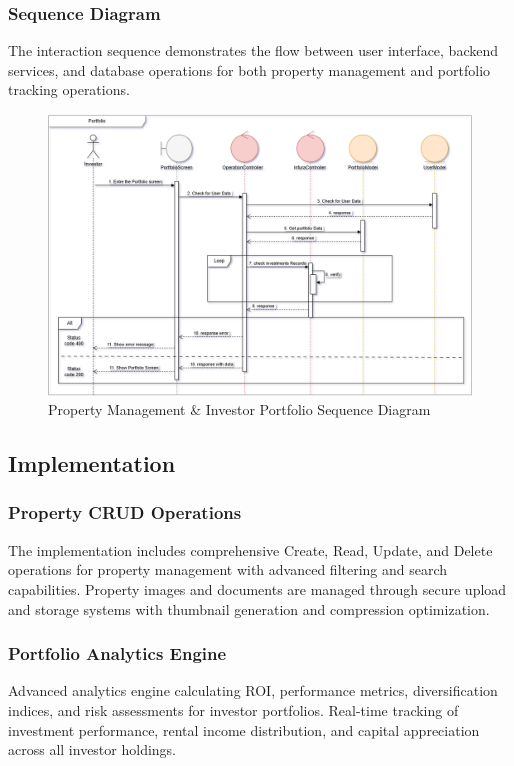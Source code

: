 \subsubsection{Sequence Diagram}
The interaction sequence demonstrates the flow between user interface, backend services, and database operations for both property management and portfolio tracking operations.
\newpage
\begin{figure}[htbp]
    \centering
    \includegraphics[width=1\textwidth]{images/property_portfolio_sequence.png}
    \caption{Property Management \& Investor Portfolio Sequence Diagram}
    \label{fig:property-portfolio-sequence}
\end{figure}

\subsection{Implementation}
\subsubsection{Property CRUD Operations}
The implementation includes comprehensive Create, Read, Update, and Delete operations for property management with advanced filtering and search capabilities. Property images and documents are managed through secure upload and storage systems with thumbnail generation and compression optimization.

\subsubsection{Portfolio Analytics Engine}
Advanced analytics engine calculating ROI, performance metrics, diversification indices, and risk assessments for investor portfolios. Real-time tracking of investment performance, rental income distribution, and capital appreciation across all investor holdings.

